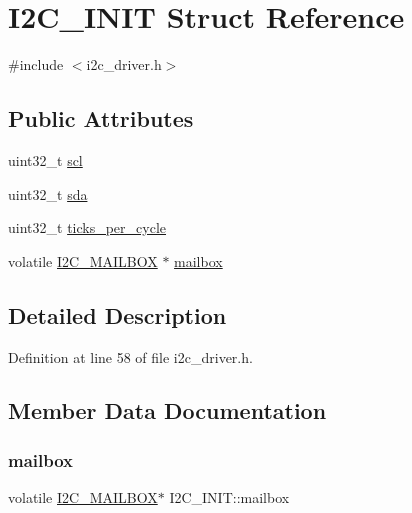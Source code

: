 \hypertarget{structI2C__INIT}{}\section{I2\+C\+\_\+\+I\+N\+IT Struct Reference}
\label{structI2C__INIT}


{\ttfamily \#include $<$i2c\+\_\+driver.\+h$>$}

\subsection*{Public Attributes}
\begin{DoxyCompactItemize}
\item 
uint32\+\_\+t \mbox{\hyperlink{structI2C__INIT_a4eab84323108506ecf1f6e9cfbd9e8ee}{scl}}
\item 
uint32\+\_\+t \mbox{\hyperlink{structI2C__INIT_abf727e795643d048abf6948aab2af0cf}{sda}}
\item 
uint32\+\_\+t \mbox{\hyperlink{structI2C__INIT_a96ddefff7dcff1e60c8e51883b6dd106}{ticks\+\_\+per\+\_\+cycle}}
\item 
volatile \mbox{\hyperlink{structI2C__MAILBOX}{I2\+C\+\_\+\+M\+A\+I\+L\+B\+OX}} $\ast$ \mbox{\hyperlink{structI2C__INIT_a30c8c51cf102bda51457e438f4ab4744}{mailbox}}
\end{DoxyCompactItemize}


\subsection{Detailed Description}


Definition at line 58 of file i2c\+\_\+driver.\+h.



\subsection{Member Data Documentation}
\mbox{\label{structI2C__INIT_a30c8c51cf102bda51457e438f4ab4744}} 
\subsubsection{\texorpdfstring{mailbox}{mailbox}}
{\footnotesize\ttfamily volatile \mbox{\hyperlink{structI2C__MAILBOX}{I2\+C\+\_\+\+M\+A\+I\+L\+B\+OX}}$\ast$ I2\+C\+\_\+\+I\+N\+I\+T\+::mailbox}



